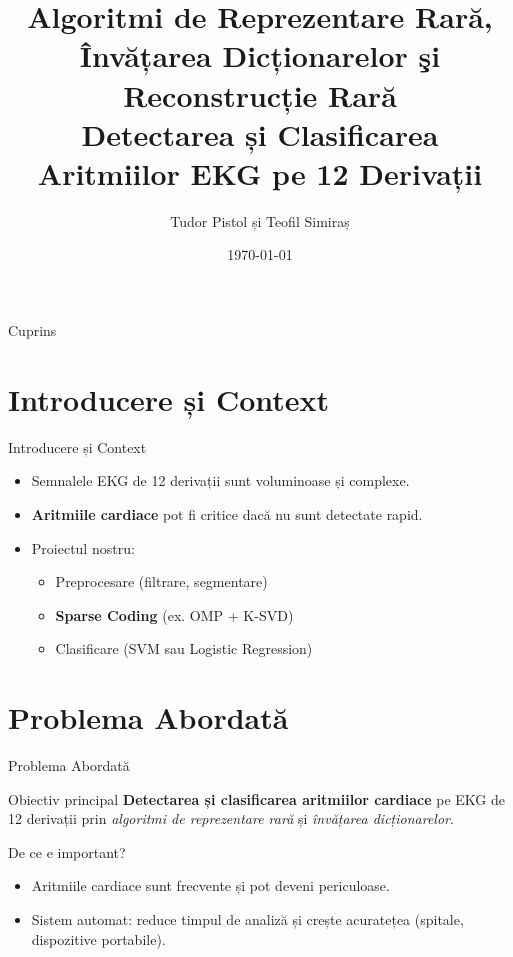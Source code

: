 \documentclass[aspectratio=169,xcolor=dvipsnames]{beamer}
\title{Algoritmi de Reprezentare Rară, Învățarea Dicționarelor şi Reconstrucție Rară\\
\large Detectarea și Clasificarea Aritmiilor EKG pe 12 Derivații}
\author{Tudor Pistol și Teofil Simiraș}
\date{\today}
\begin{document}
\begin{frame}
  \titlepage
\end{frame}

\begin{frame}{Cuprins}
  \tableofcontents
\end{frame}

\section{Introducere și Context}

\begin{frame}{Introducere și Context}
  \begin{itemize}
    \item Semnalele EKG de 12 derivații sunt voluminoase și complexe.
    \item \textbf{Aritmiile cardiace} pot fi critice dacă nu sunt detectate rapid.
    \item Proiectul nostru: 
    \begin{itemize}
      \item Preprocesare (filtrare, segmentare) \\
      \item \textbf{Sparse Coding} (ex. OMP + K-SVD) \\
      \item Clasificare (SVM sau Logistic Regression) 
    \end{itemize}
  \end{itemize}
\end{frame}

\section{Problema Abordată}

\begin{frame}{Problema Abordată}
  \begin{block}{Obiectiv principal}
    \textbf{Detectarea și clasificarea aritmiilor cardiace} pe EKG de 12 derivații prin \emph{algoritmi de reprezentare rară} și \emph{învățarea dicționarelor}.
  \end{block}
  \begin{alertblock}{De ce e important?}
    \begin{itemize}
      \item Aritmiile cardiace sunt frecvente și pot deveni periculoase.
      \item Sistem automat: reduce timpul de analiză și crește acuratețea (spitale, dispozitive portabile).
    \end{itemize}
  \end{alertblock}
\end{frame}
\end{document}
